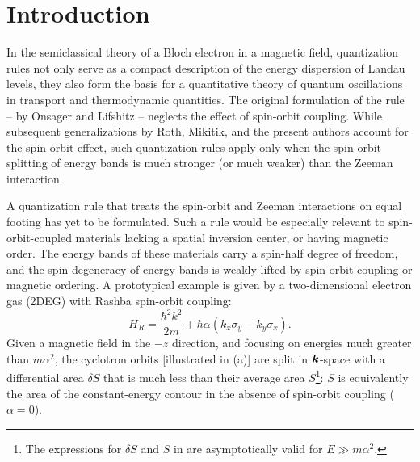 \documentclass[aps, showpacs, twocolumn, notitlepage, superscriptaddress]{revtex4-1}
\begin{document}
\maketitle


\section{Introduction}
In the semiclassical theory of a Bloch electron in a magnetic field,  quantization rules not  only serve as a compact description of the  energy dispersion of Landau levels, they also form the basis for a quantitative theory of quantum oscillations in transport\cite{SdH} and thermodynamic\cite{dHvA} quantities.  The original formulation of the rule -- by Onsager\cite{Onsager} and Lifshitz\cite{lifshitz_kosevich,lifshitz_kosevich_jetp} -- neglects the effect of spin-orbit coupling. While subsequent generalizations by Roth\cite{rotheffham,rothmag}, Mikitik\cite{Mikitik_quantizationrule}, and the present authors\cite{topoferm,100p} account for the spin-orbit effect, such quantization rules apply only when the spin-orbit splitting of energy bands is much stronger (or much weaker) than the Zeeman interaction.

A quantization rule that treats the spin-orbit and Zeeman interactions on equal footing has yet to be formulated. Such a rule would be especially relevant to spin-orbit-coupled materials lacking a spatial inversion center, or having magnetic order. The energy bands of these materials carry a spin-half degree of freedom, and the spin degeneracy of energy bands is weakly lifted by spin-orbit coupling or magnetic ordering. A prototypical example is given by  a two-dimensional electron gas (2DEG) with Rashba spin-orbit coupling:
\begin{equation}
H_R=\frac{{\hbar^2} k^2}{2m}+\hbar\alpha  (k_{x}\sigma_{y}-k_{y}\sigma_{x}).\label{eq:Rashba-Hamiltonian}
\end{equation}
Given a magnetic field in the $-z$ direction, and focusing on energies much greater than $m\alpha^2$, the cyclotron orbits [illustrated in (a)]   are split in $\boldsymbol{k}$-space with a differential area  $\delta S$ that is much less than their average area $S$\footnote{The expressions for $\delta S$ and $S$ in  are asymptotically valid for $E{\gg}m\alpha^2$.}:
$S$ is equivalently the area of the constant-energy contour in the absence of spin-orbit coupling ($\alpha{=}0$).
\end{document}
